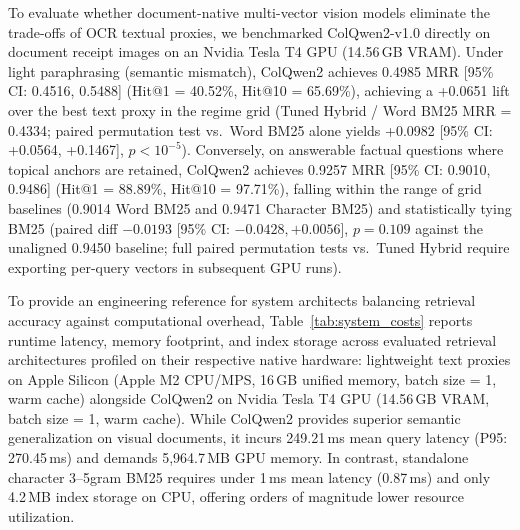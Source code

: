\documentclass[conference]{IEEEtran}
\begin{document}
To evaluate whether document-native multi-vector vision models eliminate the trade-offs of OCR textual proxies, we benchmarked ColQwen2-v1.0 \cite{faysse2024colpali} directly on document receipt images on an Nvidia Tesla T4 GPU (14.56\,GB VRAM). Under light paraphrasing (semantic mismatch), ColQwen2 achieves 0.4985 MRR [95\% CI: 0.4516, 0.5488] (Hit@1 = 40.52\%, Hit@10 = 65.69\%), achieving a +0.0651 lift over the best text proxy in the regime grid (Tuned Hybrid / Word BM25 MRR = 0.4334; paired permutation test vs.\ Word BM25 alone yields +0.0982 [95\% CI: +0.0564, +0.1467], $p < 10^{-5}$). Conversely, on answerable factual questions where topical anchors are retained, ColQwen2 achieves 0.9257 MRR [95\% CI: 0.9010, 0.9486] (Hit@1 = 88.89\%, Hit@10 = 97.71\%), falling within the range of grid baselines (0.9014 Word BM25 and 0.9471 Character BM25) and statistically tying BM25 (paired diff $-0.0193$ [95\% CI: $-0.0428, +0.0056$], $p = 0.109$ against the unaligned 0.9450 baseline; full paired permutation tests vs.\ Tuned Hybrid require exporting per-query vectors in subsequent GPU runs).

To provide an engineering reference for system architects balancing retrieval accuracy against computational overhead, Table~\ref{tab:system_costs} reports runtime latency, memory footprint, and index storage across evaluated retrieval architectures profiled on their respective native hardware: lightweight text proxies on Apple Silicon (Apple M2 CPU/MPS, 16\,GB unified memory, batch size = 1, warm cache) alongside ColQwen2 on Nvidia Tesla T4 GPU (14.56\,GB VRAM, batch size = 1, warm cache). While ColQwen2 provides superior semantic generalization on visual documents, it incurs 249.21\,ms mean query latency (P95: 270.45\,ms) and demands 5,964.7\,MB GPU memory. In contrast, standalone character 3--5gram BM25 requires under 1\,ms mean latency (0.87\,ms) and only 4.2\,MB index storage on CPU, offering orders of magnitude lower resource utilization.
\end{document}
